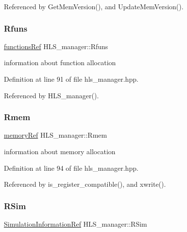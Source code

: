 Referenced by Get\+Mem\+Version(), and Update\+Mem\+Version().

\mbox{\label{classHLS__manager_aeb7b92f50edc0b210b0a4b126df3bdee}} 
\subsubsection{\texorpdfstring{Rfuns}{Rfuns}}
{\footnotesize\ttfamily \hyperlink{functions_8hpp_add94a569c98f4302fc92c66ad9075a0e}{functions\+Ref} H\+L\+S\+\_\+manager\+::\+Rfuns}



information about function allocation 



Definition at line 91 of file hls\+\_\+manager.\+hpp.



Referenced by H\+L\+S\+\_\+manager().

\mbox{\label{classHLS__manager_a6c75d253702801f3cc60f35c65b0bf58}} 
\subsubsection{\texorpdfstring{Rmem}{Rmem}}
{\footnotesize\ttfamily \hyperlink{memory_8hpp_aec1333ec6cd561731fb3ed3e55b9caf5}{memory\+Ref} H\+L\+S\+\_\+manager\+::\+Rmem}



information about memory allocation 



Definition at line 94 of file hls\+\_\+manager.\+hpp.



Referenced by is\+\_\+register\+\_\+compatible(), and xwrite().

\mbox{\label{classHLS__manager_a8daa9fa4877abca7d7fee57333840de6}} 
\subsubsection{\texorpdfstring{R\+Sim}{RSim}}
{\footnotesize\ttfamily \hyperlink{SimulationInformation_8hpp_a136ebb6fe92363bc51639d8f1422834f}{Simulation\+Information\+Ref} H\+L\+S\+\_\+manager\+::\+R\+Sim}




